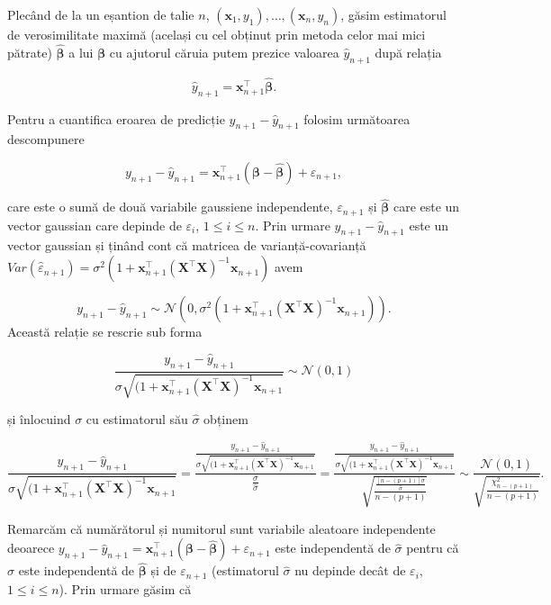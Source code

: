 \documentclass[]{article}
\begin{document}
Plecând de la un eșantion de talie \(n\),
\((\boldsymbol x_1, y_1), \ldots, (\boldsymbol x_n, y_n)\), găsim
estimatorul de verosimilitate maximă (același cu cel obținut prin metoda
celor mai mici pătrate) \(\hat{\boldsymbol\beta}\) a lui
\(\boldsymbol\beta\) cu ajutorul căruia putem prezice valoarea
\(\hat{y}_{n+1}\) după relația

\[
\hat{y}_{n+1} = \boldsymbol x_{n+1}^\intercal\hat{\boldsymbol \beta}.
\]

Pentru a cuantifica eroarea de predicție \(y_{n+1} - \hat{y}_{n+1}\)
folosim următoarea descompunere

\[
y_{n+1} - \hat{y}_{n+1} = \boldsymbol x_{n+1}^\intercal\left(\boldsymbol \beta - \hat{\boldsymbol \beta}\right) + \varepsilon_{n+1},
\]

care este o sumă de două variabile gaussiene independente,
\(\varepsilon_{n+1}\) și \(\hat{\boldsymbol \beta}\) care este un vector
gaussian care depinde de \(\varepsilon_i\), \(1\leq i\leq n\). Prin
urmare \(y_{n+1} - \hat{y}_{n+1}\) este un vector gaussian și ținând
cont că matricea de varianță-covarianță
\(Var(\hat{\varepsilon}_{n+1}) = \sigma^2\left(1 + \boldsymbol x_{n+1}^\intercal(\boldsymbol X^\intercal \boldsymbol X)^{-1}\boldsymbol x_{n+1}\right)\)
avem

\[
y_{n+1} - \hat{y}_{n+1} \sim \mathcal{N}\left(0, \sigma^2\left(1 + \boldsymbol x_{n+1}^\intercal(\boldsymbol X^\intercal \boldsymbol X)^{-1}\boldsymbol x_{n+1}\right)\right).
\] Această relație se rescrie sub forma

\[
\frac{y_{n+1} - \hat{y}_{n+1}}{\sigma\sqrt{(1 + \boldsymbol x_{n+1}^\intercal(\boldsymbol X^\intercal \boldsymbol X)^{-1}\boldsymbol x_{n+1}}} \sim \mathcal{N}(0, 1)
\]

și înlocuind \(\sigma\) cu estimatorul său \(\hat{\sigma}\) obținem

\[
\frac{y_{n+1} - \hat{y}_{n+1}}{\hat{\sigma}\sqrt{(1 + \boldsymbol x_{n+1}^\intercal(\boldsymbol X^\intercal \boldsymbol X)^{-1}\boldsymbol x_{n+1}}} = \frac{\frac{y_{n+1} - \hat{y}_{n+1}}{\sigma\sqrt{(1 + \boldsymbol x_{n+1}^\intercal(\boldsymbol X^\intercal \boldsymbol X)^{-1}\boldsymbol x_{n+1}}}}{\frac{\sigma}{\hat{\sigma}}} = \frac{\frac{y_{n+1} - \hat{y}_{n+1}}{\sigma\sqrt{(1 + \boldsymbol x_{n+1}^\intercal(\boldsymbol X^\intercal \boldsymbol X)^{-1}\boldsymbol x_{n+1}}}}{\sqrt{\frac{\frac{[n - (p+1)]\sigma}{\hat{\sigma}}}{n - (p+1)}}} \sim \frac{\mathcal{N}(0,1)}{\sqrt{\frac{\chi^2_{n-(p+1)}}{n - (p+1)}}}.
\]

Remarcăm că numărătorul și numitorul sunt variabile aleatoare
independente deoarece
\(y_{n+1} - \hat{y}_{n+1} = \boldsymbol x_{n+1}^\intercal\left(\boldsymbol \beta - \hat{\boldsymbol \beta}\right) + \varepsilon_{n+1}\)
este independentă de \(\hat{\sigma}\) pentru că \(\hat{\sigma}\) este
independentă de \(\hat{\boldsymbol \beta}\) și de \(\varepsilon_{n+1}\)
(estimatorul \(\hat{\sigma}\) nu depinde decât de \(\varepsilon_i\),
\(1\leq i\leq n\)). Prin urmare găsim că
\end{document}
